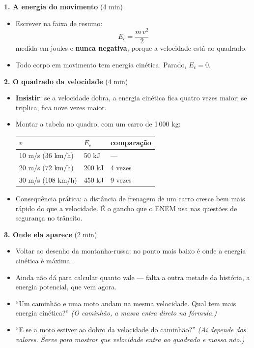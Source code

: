 \documentclass[11pt,a4paper]{article}
\begin{document}
\begin{quadro}
\textbf{1. A energia do movimento} (4 min)
\begin{itemize}[nosep]
  \item Escrever na faixa de resumo:
  \[
    \boxed{E_c = \frac{m\,v^2}{2}}
  \]
  medida em joules e \textbf{nunca negativa}, porque a velocidade
  est\'a ao quadrado.
  \item Todo corpo em movimento tem energia cin\'etica. Parado,
        $E_c = 0$.
\end{itemize}

\medskip
\textbf{2. O quadrado da velocidade} (4 min)
\begin{itemize}[nosep]
  \item \textbf{Insistir}: se a velocidade dobra, a energia cin\'etica
        fica quatro vezes maior; se triplica, fica nove vezes maior.
  \item Montar a tabela no quadro, com um carro de 1\,000 kg:
  \begin{center}\small
    \begin{tabular}{@{}lll@{}}
      \toprule
      $v$ & $E_c$ & compara\c{c}\~ao \\
      \midrule
      10 m/s (36 km/h) & 50 kJ  & --- \\
      20 m/s (72 km/h) & 200 kJ & 4 vezes \\
      30 m/s (108 km/h) & 450 kJ & 9 vezes \\
      \bottomrule
    \end{tabular}
  \end{center}
  \item Consequ\^encia pr\'atica: a dist\^ancia de frenagem de um carro
        cresce bem mais r\'apido do que a velocidade. \'E o gancho que
        o ENEM usa nas quest\~oes de seguran\c{c}a no tr\^ansito.
\end{itemize}

\medskip
\textbf{3. Onde ela aparece} (2 min)
\begin{itemize}[nosep]
  \item Voltar ao desenho da montanha-russa: no ponto mais baixo \'e
        onde a energia cin\'etica \'e m\'axima.
  \item Ainda n\~ao d\'a para calcular quanto vale --- falta a outra
        metade da hist\'oria, a energia potencial, que vem agora.
\end{itemize}
\end{quadro}

\begin{perguntas}
\begin{itemize}[nosep]
  \item ``Um caminh\~ao e uma moto andam na mesma velocidade. Qual tem
        mais energia cin\'etica?''
        \textit{(O caminh\~ao, a massa entra direto na f\'ormula.)}
  \item ``E se a moto estiver ao dobro da velocidade do caminh\~ao?''
        \textit{(A\'i depende dos valores. Serve para mostrar que
        velocidade entra ao quadrado e massa n\~ao.)}
\end{itemize}
\end{perguntas}
\end{document}
